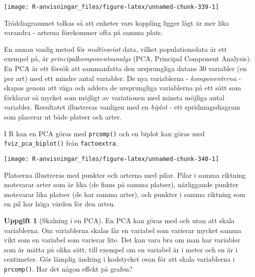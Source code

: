 \documentclass[
]{book}
\newenvironment{Shaded}{\begin{snugshade}}{\end{snugshade}}
\newcommand{\AttributeTok}[1]{\textcolor[rgb]{0.77,0.63,0.00}{#1}}
\newcommand{\DecValTok}[1]{\textcolor[rgb]{0.00,0.00,0.81}{#1}}
\newcommand{\FunctionTok}[1]{\textcolor[rgb]{0.00,0.00,0.00}{#1}}
\newcommand{\NormalTok}[1]{#1}
\newcommand{\OtherTok}[1]{\textcolor[rgb]{0.56,0.35,0.01}{#1}}
\newcommand{\SpecialCharTok}[1]{\textcolor[rgb]{0.00,0.00,0.00}{#1}}
\newcommand{\StringTok}[1]{\textcolor[rgb]{0.31,0.60,0.02}{#1}}
\theoremstyle{definition}
\theoremstyle{definition}
\theoremstyle{definition}
\newtheorem{exercise}{Uppgift}[chapter]
\theoremstyle{definition}
\theoremstyle{remark}
\begin{document}
\begin{center}\texttt{[image: R-anvisningar\_files/figure-latex/unnamed-chunk-339-1]} \end{center}

Träddiagrammet tolkas så att enheter vars koppling ligger lågt är mer lika varandra - arterna förekommer ofta på samma plats.

En annan vanlig metod för \emph{multivariat} data, vilket populationsdata är ett exempel på, är \emph{principalkomponentsanalys} (PCA, Principal Component Analysis). En PCA är ett försök att sammanfatta den ursprungliga datans 30 variabler (en per art) med ett mindre antal variabler. De nya variablerna - \emph{komponenterna} - skapas genom att väga och addera de ursprungliga variablerna på ett sätt som förklarar så mycket som möjligt av variationen med minsta möjliga antal variabler. Resultatet illustreras vanligen med en \emph{biplot} - ett spridningsdiagram som placerar ut både platser och arter.

I R kan en PCA göras med \texttt{prcomp()} och en biplot kan göras med \texttt{fviz\_pca\_biplot()} från \texttt{factoextra}.

\begin{Shaded}
\end{Shaded}

\begin{center}\texttt{[image: R-anvisningar\_files/figure-latex/unnamed-chunk-340-1]} \end{center}

Platserna illustreras med punkter och arterna med pilar. Pilar i samma riktning motsvarar arter som är lika (de finns på samma platser), närliggande punkter motsvarar lika platser (de har samma arter), och punkter i samma riktning som en pil har höga värden för den arten.

\begin{exercise}[Skalning i en PCA]
En PCA kan göras med och utan att skala variablerna. Om variablerna skalas får en variabel som varierar mycket samma vikt som en variabel som varierar lite. Det kan vara bra om man har variabler som är mätta på olika sätt, till exempel om en variabel är i meter och en är i centimeter. Gör lämplig ändring i kodstycket ovan för att skala variablerna i \texttt{prcomp()}. Har det någon effekt på grafen?
\end{exercise}
\end{document}
